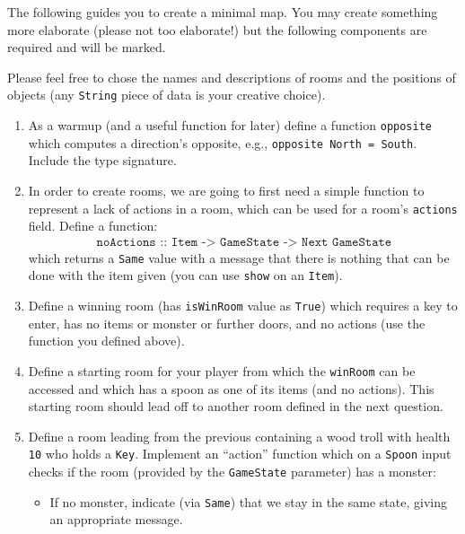 \documentclass{article}
\newcommand{\topMarks}[1]{\marginnote{(#1 marks)}}
\begin{document}
The following guides you to create a minimal map. You may create
something more elaborate (please not too elaborate!) but the following
components are required and will be marked.

Please feel free to chose the names and descriptions of rooms and the
positions of objects (any \texttt{String} piece of data is
your creative choice).

\begin{enumerate}
\item \topMarks{3} As a warmup (and a useful function for later)
  define a function \texttt{opposite} which computes a direction's
  opposite, e.g., \texttt{opposite North = South}. Include the type signature.

\item \topMarks{3} In order to create rooms, we are going to first need a simple
  function to represent a lack of actions in a room, which can be used
  for a room's \texttt{actions} field. Define a function:
%
\begin{align*}
\texttt{noActions :: Item -> GameState -> Next GameState}
\end{align*}
%
which returns a \texttt{Same} value with a message that there is
nothing that can be done with the item given (you can use
\texttt{show} on an \texttt{Item}).

\item \topMarks{4} Define a winning room (has \texttt{isWinRoom} value as
  \texttt{True}) which requires a key to enter, has no items or
  monster or further doors, and no actions (use the function you
  defined above).

\item \topMarks{5} Define a starting room for your player from which the
  \texttt{winRoom} can be accessed and which has a spoon as one of its
  items (and no actions). This starting room should lead off to
  another room defined in the next question.

\item \topMarks{12} Define a room leading from the previous containing a wood troll with
  health \texttt{10} who holds a \texttt{Key}.  Implement an
  ``action'' function which on a \texttt{Spoon} input checks if the
  room (provided by the \texttt{GameState} parameter) has a monster:
 \begin{itemize}
 \item If no monster, indicate (via \texttt{Same}) that we stay
   in the same state, giving an appropriate message.


\end{itemize}
\end{enumerate}
\end{document}
